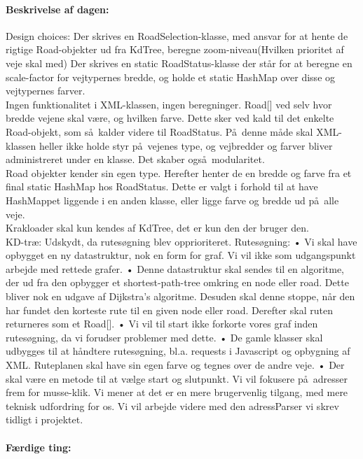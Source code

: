 \documentclass[a4paper,10pt,titlepage]{article}
\begin{document}
		\paragraph{Beskrivelse af dagen:}
		Design choices:
	Der skrives en RoadSelection-klasse, med ansvar for at hente de rigtige Road-objekter ud fra KdTree, beregne zoom-niveau(Hvilken prioritet af veje skal med)
Der skrives en static RoadStatus-klasse der st\aa r for at beregne en scale-factor for vejtypernes bredde, og holde et static HashMap over disse og vejtypernes farver.\\
Ingen funktionalitet i XML-klassen, ingen beregninger. Road[] ved selv hvor bredde vejene skal v\ae re, og hvilken farve. Dette sker ved kald til det enkelte Road-objekt, som s\aa \ kalder videre til RoadStatus. P\aa \ denne m\aa de skal XML-klassen heller ikke holde styr p\aa \ vejenes type, og vejbredder og farver bliver administreret under en klasse. Det skaber ogs\aa \ modularitet.\\
Road objekter kender sin egen type. Herefter henter de en bredde og farve fra et final static HashMap hos RoadStatus. Dette er valgt i forhold til at have HashMappet liggende i en anden klasse, eller ligge farve og bredde ud p\aa \ alle veje.\\
Krakloader skal kun kendes af KdTree, det er kun den der bruger den.\\
KD-tr\ae :
Udskydt, da rutes\o gning blev opprioriteret.
Rutes\o gning:
•	Vi skal have opbygget en ny datastruktur, nok en form for graf. Vi vil ikke som udgangspunkt arbejde med rettede grafer.
•	Denne datastruktur skal sendes til en algoritme, der ud fra den opbygger et shortest-path-tree omkring en node eller road. Dette bliver nok en udgave af Dijkstra’s algoritme. Desuden skal denne stoppe, n\aa r den har fundet den korteste rute til en given node eller road. Derefter skal ruten returneres som et Road[].
•	Vi vil til start ikke forkorte vores graf inden rutes\o gning, da vi forudser problemer med dette.
•	De gamle klasser skal udbygges til at h\aa ndtere rutes\o gning, bl.a. requests i Javascript og opbygning af XML. Ruteplanen skal have sin egen farve og tegnes over de andre veje.
•	Der skal v\ae re en metode til at v\ae lge start og slutpunkt. Vi vil fokusere p\aa \ adresser frem for musse-klik. Vi mener at det er en mere brugervenlig tilgang, med mere teknisk udfordring for os. Vi vil arbejde videre med den adressParser vi skrev tidligt i projektet.

		\paragraph{F\ae rdige ting:}
		
\end{document}
